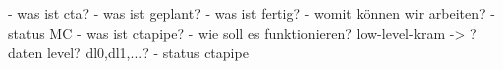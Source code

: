 \begin{frame}
    - was ist cta?
    - was ist geplant?
    - was ist fertig?
    - womit können wir arbeiten?
    - status MC
    - was ist ctapipe?
    - wie soll es funktionieren? low-level-kram -> ? daten level? dl0,dl1,...?
    - status ctapipe
\end{frame}